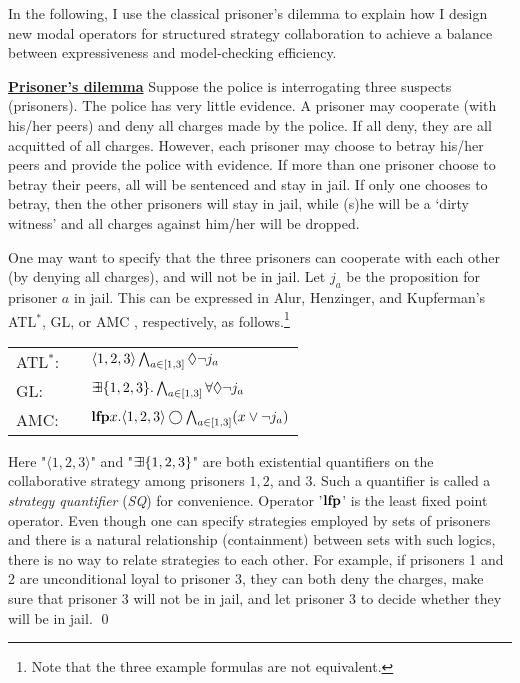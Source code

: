 In the following, I use the classical prisoner's dilemma to explain how I design new modal operators for structured strategy collaboration to achieve a balance between expressiveness and model-checking efficiency.

{ \label{exmp.pd} \underline{\bf Prisoner's dilemma}} 
Suppose the police is interrogating three suspects (prisoners).  
The police has very little evidence.  
A prisoner may cooperate (with his/her peers) and deny all charges made by the police. 
If all deny, they are all acquitted of all charges.  
However, each prisoner may choose to betray his/her peers
and provide the police with evidence.
If more than one prisoner choose to betray their peers, all will be sentenced and stay in jail.
If only one chooses to betray, then the other prisoners will stay in jail, while (s)he will be a `dirty witness' and all charges against him/her will be dropped.

One may want to specify that the three prisoners can cooperate with each other (by denying all charges), and will not be in jail.  
Let $j_a$ be the proposition for prisoner $a$ in jail.  
This can be expressed in Alur, Henzinger, and Kupferman's ATL$^*$, GL, or AMC \cite{AHK02}, respectively, as follows.\footnote{Note that the three example formulas are not equivalent.}  
\begin{center} 
\begin{tabular}{lll} 
ATL$^*$: 
& &  $\langle 1,2,3\rangle\bigwedge_{a\in[1,3]}\Diamond \neg j_a$ \\
GL: 
& & $\mbox{$\exists\!\!\exists$}\{1,2,3\}.\bigwedge_{a\in[1,3]}\forall\Diamond\neg j_a$ \\
AMC: 
& & $\mbox{\bf lfp} x.\langle 1,2,3\rangle \bigcirc 
\bigwedge_{a\in[1,3]}(x\vee \neg j_a)$
\end{tabular} 
\end{center} 
Here "$\langle 1,2,3\rangle$" and 
"$\mbox{$\exists\!\!\exists$}\{1,2,3\}$" are both existential 
quantifiers on the collaborative strategy among prisoners $1,2$, and $3$.  
Such a quantifier is called a {\em strategy quantifier} ({\em SQ}) for convenience.
Operator '$\mbox{\bf lfp}$' is the least fixed point operator.  
Even though one can specify strategies employed by sets of prisoners and there is a natural relationship (containment) between sets with such logics, there is no way to relate strategies to each other.
For example, if prisoners 1 and 2 are unconditional loyal to prisoner 3, they can both deny the charges, make sure that prisoner 3 will not be in jail, and let prisoner 3 to decide whether they will be in jail.
\qed


